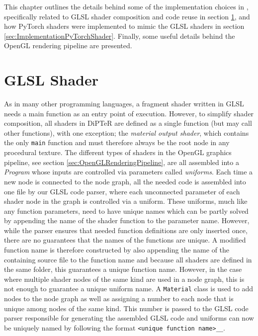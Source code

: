 This chapter outlines the details behind some of the implementation choices in \dipter{}, specifically related to GLSL shader composition and code reuse in section \ref{sec:ImplementationProceduralShadingGLSL}, and how PyTorch shaders were implemented to mimic the GLSL shaders in section \ref{sec:ImplementationPyTorchShader}. Finally, some useful details behind the OpenGL rendering pipeline are presented.

\section{GLSL Shader} \label{sec:ImplementationProceduralShadingGLSL}
 As in many other programming languages, a fragment shader written in GLSL needs a main function as an entry point of execution. However, to simplify shader composition, all shaders in DiPTeR are defined as a single function (but may call other functions), with one exception; the \textit{material output shader}, which contains the only \texttt{main} function and must therefore always be the root node in any procedural texture. The different types of shaders in the OpenGL graphics pipeline, see section \ref{sec:OpenGLRenderingPipeline}, are all assembled into a \textit{Program} whose inputs are controlled via parameters called \textit{uniforms}. Each time a new node is connected to the node graph, all the needed code is assembled into one file by our GLSL code parser, where each unconnected parameter of each shader node in the graph is controlled via a uniform. These uniforms, much like any function parameters, need to have unique names which can be partly solved by appending the name of the shader function to the parameter name. However, while the parser ensures that needed function definitions are only inserted once, there are no guarantees that the names of the functions are unique. A modified function name is therefore constructed by also appending the name of the containing source file to the function name and because all shaders are defined in the same folder, this guarantees a unique function name. However, in the case where multiple shader nodes of the same kind are used in a node graph, this is not enough to guarantee a unique uniform name. A \texttt{Material} class is used to add nodes to the node graph as well as assigning a number to each node that is unique among nodes of the same kind. This number is passed to the GLSL code parser responsible for generating the assembled GLSL code and uniforms can now be uniquely named by following the format \texttt{<unique function name>\_<node number>\_<parameter name>}. 
 

